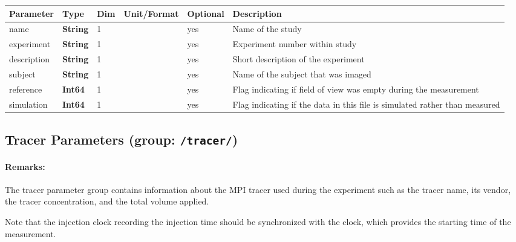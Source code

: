 \documentclass[landscape]{article} %
\newcommand{\inl}[1]{\lstinline[columns=fixed]{#1}}
\newcommand{\inltab}[1]{{\ttfamily\bfseries\color{blue}#1}}
\newcommand{\inlvar}[1]{{\ttfamily#1}}
\begin{document}
\noindent \begin{tabularx}{\columnwidth}{lllllX} 
\textbf{Parameter} & \textbf{Type} & \textbf{Dim} & \textbf{Unit/Format} & \textbf{Optional} & \textbf{Description} \\ \hline 
\inlvar{name} & \inltab{String} & 1 & & yes & Name of the study \\ \hline
\inlvar{experiment} & \inltab{String} & 1 & & yes & Experiment number within study \\ \hline
\inlvar{description} & \inltab{String} & 1 & & yes & Short description of the experiment \\ \hline
\inlvar{subject} & \inltab{String} & 1 & & yes & Name of the subject that was imaged \\ \hline 
\inlvar{reference} & \inltab{Int64} & 1 & & yes & Flag indicating if field of view was empty during the measurement \\ \hline
\inlvar{simulation} & \inltab{Int64} & 1 & & yes & Flag indicating if the data in this file is simulated rather than measured \\ \hline
\end{tabularx}


\subsection{Tracer Parameters (group: \inl{/tracer/})}

\begin{multicols}{2}

\paragraph{Remarks:} The tracer parameter group contains information about the MPI tracer used during the experiment such as the tracer name, its vendor, the tracer concentration, and the total volume applied.

Note that the injection clock recording the injection time should be synchronized with the clock, which provides the starting time of the measurement.

\end{multicols}
\end{document}
